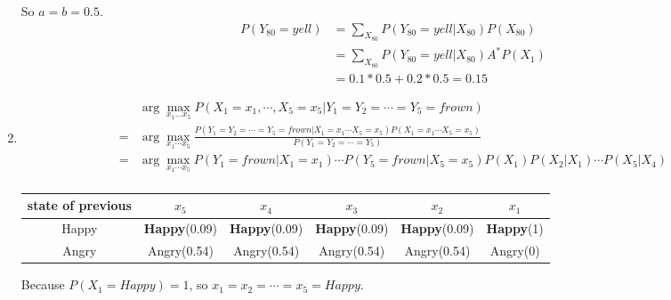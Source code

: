 \documentclass[12pt]{article}
\begin{document}
\begin{enumerate}
\begin{equation}
	\end{equation}
	So $a=b=0.5$.
	\begin{equation}
		\begin{split}
			P(Y_{80}=yell) &= \sum_{X_{80}}P(Y_{80}=yell|X_{80})P(X_{80})\\
			&= \sum_{X_{80}}P(Y_{80}=yell|X_{80}) A^* P(X_1)\\
			&= 0.1*0.5+0.2*0.5 = 0.15
		\end{split}
	\end{equation}
	\item
	\begin{equation}
		\begin{split}
			&\arg \max_{x_1\dots x_5} P(X_1=x_1,\cdots,X_5=x_5|Y_1=Y_2=\cdots =Y_5=frown)\\
			=&\arg \max_{x_1\cdots x_5}\frac{P(Y_1=Y_2=\cdots=Y_5=frown|X_1=x_1\cdots X_5=x_5)P(X_1=x_1\cdots X_5=x_5)}{P(Y_1=Y_2=\cdots =Y_5)}\\
			=&\arg \max_{x_1\cdots x_5} P(Y_1=frown|X_1=x_1)\cdots P(Y_5=frown|X_5=x_5) P(X_1) P(X_2|X_1)\cdots P(X_5|X_4)\\
		\end{split}
	\end{equation}
	\begin{table}[!htbp]
		\begin{tabular}{c|c|c|c|c|c}
			\hline
			state of previous & $x_5$ & $x_4$ & $x_3$ & $x_2$ & $x_1$\\
			\hline
			Happy & \textbf{Happy}(0.09) & \textbf{Happy}(0.09) & \textbf{Happy}(0.09) & \textbf{Happy}(0.09)& \textbf{Happy}(1)\\
			\hline
			Angry & Angry(0.54) & Angry(0.54) &Angry(0.54) &Angry(0.54) &Angry(0)\\
			\hline
		\end{tabular}
	\end{table}
	
	Because $P(X_1=Happy)=1$, so $x_1 = x_2 = \cdots = x_5 = Happy$.
\end{enumerate}
\end{document}
